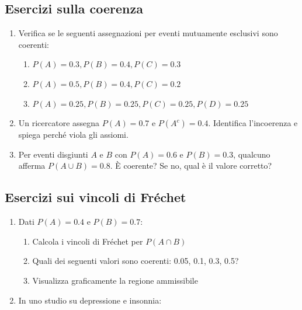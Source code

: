 \documentclass[
  italian,
  letterpaper,
  a4paper,
  11pt,
  open=any]{scrbook}
\providecommand{\tightlist}{%
  \setlength{\itemsep}{0pt}\setlength{\parskip}{0pt}}
\theoremstyle{plain}
\theoremstyle{definition}
\theoremstyle{definition}
\theoremstyle{remark}
\begin{document}
\begin{tcolorbox}[enhanced jigsaw, arc=.35mm, bottomrule=.15mm, bottomtitle=1mm, breakable, colback=white, colbacktitle=quarto-callout-important-color!10!white, colframe=quarto-callout-important-color-frame, coltitle=black, left=2mm, leftrule=.75mm, opacityback=0, opacitybacktitle=0.6, rightrule=.15mm, title=\textcolor{quarto-callout-important-color}{\faExclamation}\hspace{0.5em}{Problemi}, titlerule=0mm, toprule=.15mm, toptitle=1mm]

\subsection{Esercizi sulla coerenza}\label{esercizi-sulla-coerenza}

\begin{enumerate}
\def\labelenumi{\arabic{enumi}.}
\item
  Verifica se le seguenti assegnazioni per eventi mutuamente esclusivi
  sono coerenti:

  \begin{enumerate}
  \def\labelenumii{\alph{enumii}.}
  \tightlist
  \item
    \(P(A) = 0.3, P(B) = 0.4, P(C) = 0.3\)
  \item
    \(P(A) = 0.5, P(B) = 0.4, P(C) = 0.2\)
  \item
    \(P(A) = 0.25, P(B) = 0.25, P(C) = 0.25, P(D) = 0.25\)
  \end{enumerate}
\item
  Un ricercatore assegna \(P(A) = 0.7\) e \(P(A^c) = 0.4\). Identifica
  l'incoerenza e spiega perché viola gli assiomi.
\item
  Per eventi disgiunti \(A\) e \(B\) con \(P(A) = 0.6\) e
  \(P(B) = 0.3\), qualcuno afferma \(P(A \cup B) = 0.8\). È coerente? Se
  no, qual è il valore corretto?
\end{enumerate}

\subsection{Esercizi sui vincoli di
Fréchet}\label{esercizi-sui-vincoli-di-fruxe9chet}

\begin{enumerate}
\def\labelenumi{\arabic{enumi}.}
\setcounter{enumi}{3}
\item
  Dati \(P(A) = 0.4\) e \(P(B) = 0.7\):

  \begin{enumerate}
  \def\labelenumii{\alph{enumii}.}
  \tightlist
  \item
    Calcola i vincoli di Fréchet per \(P(A \cap B)\)
  \item
    Quali dei seguenti valori sono coerenti: 0.05, 0.1, 0.3, 0.5?
  \item
    Visualizza graficamente la regione ammissibile
  \end{enumerate}
\item
  In uno studio su depressione e insonnia:


\end{enumerate}
\end{tcolorbox}
\end{document}
